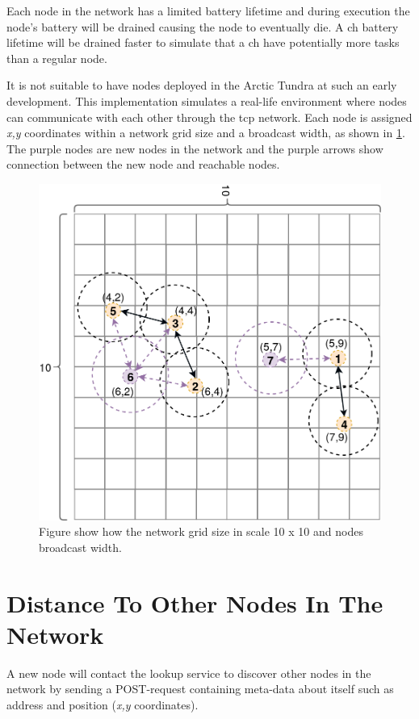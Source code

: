 \documentclass[USenglish]{uit-thesis}
\begin{document}
Each node in the network has a limited battery lifetime and during execution the node's battery will be drained causing the node to eventually die. A \gls{ch} battery lifetime will be drained faster to simulate that a \gls{ch} have potentially more tasks than a regular node.

It is not suitable to have nodes deployed in the Arctic Tundra at such an early development. This implementation simulates a real-life environment where nodes can communicate with each other through the \gls{tcp} network. Each node is assigned \textit{x,y} coordinates within a network grid size and a broadcast width, as shown in \ref{fig:broadcastNeighbour2}. The purple nodes are new nodes in the network and the purple arrows show connection between the new node and reachable nodes.


\begin{figure}
\centering
\includegraphics[scale=0.26]{contactNewNeighbour_3.png}
\caption{Figure show how the network grid size in scale 10 x 10 and nodes broadcast width.}
\label{fig:broadcastNeighbour2}
\end{figure}



\section{Distance To Other Nodes In The Network}
A new node will contact the lookup service to discover other nodes in the network by sending a POST-request containing meta-data about itself such as address and position (\textit{x,y} coordinates).
\end{document}
